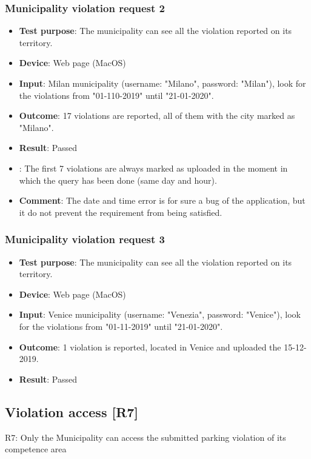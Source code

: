 \documentclass[../ATD.tex]{subfiles}
\begin{document}
    \subsubsection{Municipality violation request 2}\label{subsubsec:municiplaity-violation-request-2}
    \begin{itemize}
        \item \textbf{Test purpose}: The municipality can see all the violation reported on its territory.
        \item \textbf{Device}: Web page (MacOS)
        \item \textbf{Input}: Milan municipality (username: "Milano", password: "Milan"), look for the violations from "01-110-2019" until "21-01-2020".
        \item \textbf{Outcome}: 17 violations are reported, all of them with the city marked as "Milano".
        \item \textbf{Result}: Passed
        \item {}: The first 7 violations are always marked as uploaded in the moment in which the query has been done (same day and hour).
        \item \textbf{Comment}: The date and time error is for sure a bug of the application, but it do not prevent the requirement from being satisfied.
    \end{itemize}

    \subsubsection{Municipality violation request 3}\label{subsubsec:municiplaity-violation-request-3}
    \begin{itemize}
        \item \textbf{Test purpose}: The municipality can see all the violation reported on its territory.
        \item \textbf{Device}: Web page (MacOS)
        \item \textbf{Input}: Venice municipality (username: "Venezia", password: "Venice"), look for the violations from "01-11-2019" until "21-01-2020".
        \item \textbf{Outcome}: 1 violation is reported, located in Venice and uploaded the 15-12-2019.
        \item \textbf{Result}: Passed
    \end{itemize}

    \subsection{Violation access [R7]}\label{subsec:violation-access-1}
    R7: Only the Municipality can access the submitted parking violation of its competence area
\end{document}
